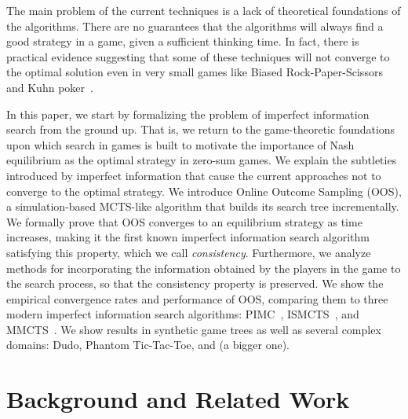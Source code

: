 \documentclass[letterpaper]{article}
\newcounter{vlNoteCounter}
\newcommand{\vlnote}[1]{{\scriptsize \color{blue} $\blacksquare$ \refstepcounter{vlNoteCounter}\textsf{[VL]$_{\arabic{vlNoteCounter}}$:{#1}}}}
\begin{document}

The main problem of the current techniques is a lack of theoretical foundations of the algorithms. There are no guarantees that the algorithms will always find a good strategy in a game, given a sufficient thinking time. In fact, there is practical evidence suggesting that some of these techniques will not converge to the optimal solution even in very small games like Biased Rock-Paper-Scissors and Kuhn poker~\cite{Shafiei09,Ponsen11Computing}.

In this paper, we start by formalizing the problem of imperfect information search from the ground up. That is, we return to the game-theoretic 
foundations upon which search in games is built to motivate the importance of Nash equilibrium as the optimal strategy in zero-sum games. We explain the subtleties introduced by imperfect information that cause the current approaches not to converge to the optimal strategy. We introduce Online Outcome Sampling (OOS), a simulation-based MCTS-like algorithm that builds its search tree incrementally. 
We formally prove that OOS converges to an equilibrium strategy as time increases, making it the first 
known imperfect information search algorithm satisfying this property, which we call {\it consistency}. Furthermore, we analyze methods for incorporating the information obtained by the players in the game to the search process, so that the consistency property is preserved. We show the empirical convergence rates and performance of OOS, comparing them to three modern imperfect information search algorithms: 
PIMC~\cite{Long10Understanding}, ISMCTS~\cite{Cowling12ISMCTS}, and MMCTS~\cite{Auger11Multiple}.
We show results in synthetic game trees as well as several complex domains: Dudo, Phantom Tic-Tac-Toe, 
and (a bigger one).



\section{Background and Related Work}
\end{document}
